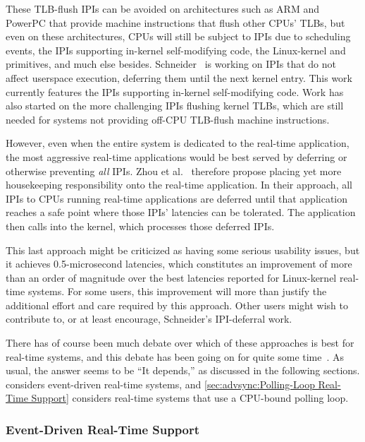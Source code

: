 These TLB-flush IPIs can be avoided on architectures such as ARM and
PowerPC that provide machine instructions that flush other CPUs'
TLBs, but even on these architectures, CPUs will still be subject
to IPIs due to scheduling events, the  IPIs supporting
in-kernel self-modifying code, the Linux-kernel 
and  primitives, and much else besides.
Schneider~\cite{ValentinScheider2025IPIinterference}
is working on IPIs that do not affect userspace execution, deferring
them until the next kernel entry.
This work currently features the  IPIs supporting
in-kernel self-modifying code.
Work has also started on the more challenging IPIs flushing kernel TLBs,
which are still needed for systems not providing off-CPU TLB-flush
machine instructions.

However, even when the entire system is dedicated to the real-time
application, the most aggressive real-time applications would be best
served by deferring or otherwise preventing \emph{all} IPIs.
Zhou et al.~\cite{ZhouyiZhou2025deterministicsub05responselinux}
therefore propose placing yet more housekeeping responsibility onto
the real-time application.
In their approach, all IPIs to CPUs running real-time applications are
deferred until that application reaches a safe point where those IPIs'
latencies can be tolerated.
The application then calls into the kernel, which processes those
deferred IPIs.

This last approach might be criticized as having some serious usability
issues, but it achieves 0.5-microsecond latencies, which constitutes an
improvement of more than an order of magnitude over the best latencies
reported for Linux-kernel real-time systems.
For some users, this improvement will more than justify the additional
effort and care required by this approach.
Other users might wish to contribute to, or at least encourage,
Schneider's IPI-deferral work.

There has of course been much debate over which of these approaches
is best for real-time systems, and this debate has been going on for
quite some
time~\cite{JonCorbet2004RealTimeLinuxPart1,JonCorbet2004RealTimeLinuxPart2}.
As usual, the answer seems to be ``It depends,'' as discussed in the
following sections.
considers event-driven real-time systems, and
\cref{sec:advsync:Polling-Loop Real-Time Support}
considers real-time systems that use a CPU-bound polling loop.

\subsubsection{Event-Driven Real-Time Support}
\label{sec:advsync:Event-Driven Real-Time Support}

